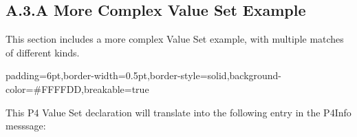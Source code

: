 \documentclass[11pt]{article}
\begin{document}
{\begin{table}[h!]
\begin{mdcenter}
\mdhr{}%

\noindent{}%
\end{mdcenter}\label{tab-p4-annotations}%
\end{table}%

\subsection{A.3.\hspace*{0.5em}A More Complex Value Set Example}\label{sec-value-set-example}%

\noindent{}This section includes a more complex Value Set example, with multiple matches of
different kinds.%

\begin{mdbmargintb}{6pt}{6pt}%
\begin{mdblock}{padding=6pt,border-width=0.5pt,border-style=solid,background-color=\#FFFFDD,breakable=true}%
\begin{mdpre}%
\end{mdpre}%
\end{mdblock}%
\end{mdbmargintb}%

\noindent{}This P4 Value Set declaration will translate into the following entry in the
P4Info messsage:%

}
\end{document}
